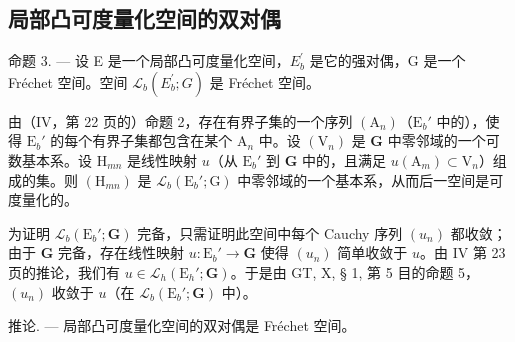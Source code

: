 \subsection{局部凸可度量化空间的双对偶}

命题 3. --- 设 E 是一个局部凸可度量化空间，\(E_{b}^{\prime}\) 是它的强对偶，G 是一个 Fréchet 空间。空间 \(\mathcal{L}_{b}(E_{b}^{\prime}; G)\) 是 Fréchet 空间。

由（IV，第 22 页的）命题 2，存在有界子集的一个序列 \((\mathrm{A}_n)\)（\(\mathrm{E}_b'\) 中的），使得 \(\mathrm{E}_b'\) 的每个有界子集都包含在某个 \(\mathrm{A}_n\) 中。设 \((\mathrm{V}_n)\) 是 \(\mathbf{G}\) 中零邻域的一个可数基本系。设 \(\mathrm{H}_{mn}\) 是线性映射 \(u\)（从 \(\mathrm{E}_b'\) 到 \(\mathbf{G}\) 中的，且满足 \(u(\mathrm{A}_m) \subset \mathrm{V}_n\)）组成的集。则 \((\mathrm{H}_{mn})\) 是 \(\mathcal{L}_b(\mathrm{E}_b'; \mathrm{G})\) 中零邻域的一个基本系，从而后一空间是可度量化的。

为证明 \(\mathcal{L}_b(\mathrm{E}_b';\mathbf{G})\) 完备，只需证明此空间中每个 Cauchy 序列 \((u_n)\) 都收敛；由于 \(\mathbf{G}\) 完备，存在线性映射 \(u:\mathrm{E}_b' \to \mathbf{G}\) 使得 \((u_n)\) 简单收敛于 \(u\)。由 IV 第 23 页的推论，我们有 \(u \in \mathcal{L}_h(\mathrm{E}_h';\mathbf{G})\)。于是由 GT, X, § 1, 第 5 目的命题 5，\((u_n)\) 收敛于 \(u\)（在 \(\mathcal{L}_b(\mathrm{E}_b';\mathbf{G})\) 中）。

推论. --- 局部凸可度量化空间的双对偶是 Fréchet 空间。

